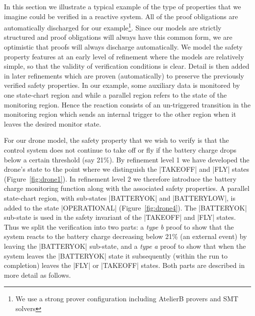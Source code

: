 In this section we illustrate a typical example of the type of properties that we imagine could be verified in a reactive \SCXML system.
All of the proof obligations are automatically discharged for our example\footnote{We use a strong prover configuration including AtelierB provers and SMT solvers}.
Since our models are strictly structured and proof obligations will always have this common form, we are optimistic that proofs will always discharge automatically.
We model the safety property features at an early level of refinement where the models are relatively simple, so that the validity of verification conditions is clear. 
Detail is then added in later refinements which are proven (automatically) to preserve the previously verified safety properties.
In our example, some auxiliary data is monitored by one state-chart region and while a parallel region refers to the state of the monitoring region. 
Hence the reaction consists of an un-triggered transition in the monitoring region which sends an internal trigger to the other region when it leaves the desired monitor state.

For our drone model, the safety property that we wish to verify is that the control system does not continue to take off or fly if the battery charge drops below a certain threshold (say 21\%). 
By refinement level 1 we have developed the drone's state to the point where we distinguish the |TAKEOFF| and |FLY| states (Figure~\ref{fig:drone1}).
In refinement level 2 we therefore introduce the battery charge monitoring function along with the associated safety properties.
A parallel state-chart region, with sub-states |BATTERYOK| and |BATTERYLOW|, is added to the state |OPERATIONAL| (Figure~\ref{fig:drone4}).
The |BATTERYOK| sub-state is used in the safety invariant of the |TAKEOFF| and |FLY| states.
Thus we split the verification into two parts: a \emph{type b} proof to show that the system reacts to the battery charge decreasing below 21\% (an external event) by leaving the  |BATTERYOK| sub-state, and a \emph{type a} proof to show that when the system leaves the |BATTERYOK| state it subsequently (within the run to completion) leaves the |FLY| or |TAKEOFF| states. 
Both parts are described in more detail as follows.

